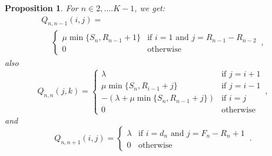 \documentclass[conference]{IEEEtran}
\newtheorem{prosi}{Proposition}
\begin{document}
\begin{prosi}
For $n \in {2,....K-1}$, we get:
\begin{multline*}
Q_{n,n-1}(i,j)= \\
\quad \ 
\begin{cases}
\mu \min\{S_{n},R_{n-1}\!+\!1\}  & \text{if } i= \! 1 \text{ and } j= \! R_{n-1} \! - \! R_{n-2}\\
0 & \text{otherwise}
\end{cases}\, ,
\end{multline*}
also
\begin{equation*}
Q_{n,n}(j,k) = 
\begin{cases}
\lambda                                 & \text{if } j=i+1\\
\mu \min\{S_{n},R_{i-1}+j\}             & \mbox{if } j=i-1\\
-(\lambda+\mu \min\{S_{n},R_{n-1}+j\})  & \text{if } i=j\\
0                                       & \text{otherwise}
\end{cases}\, ,
\end{equation*}
and
\begin{equation*}
Q_{n,n+1}(i,j) = 
\begin{cases}
\lambda             & \text{if } i=d_{n} \text{ and } j=F_{n}-R_{n}+1\\
0                   & \mbox{otherwise}
\end{cases}\, .
\end{equation*}


\end{prosi}
\end{document}
